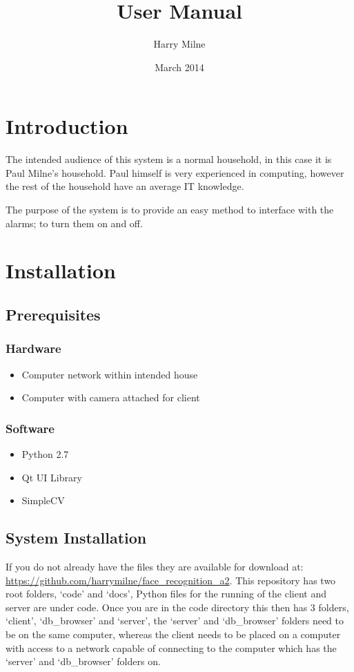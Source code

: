 \documentclass[a4paper]{article}
\title{User Manual}
\author{Harry Milne}
\date{March 2014}
\begin{document}
\maketitle
\tableofcontents
\newpage

\section{Introduction}

    The intended audience of this system is a normal household, in this case it is Paul Milne's household. Paul himself is very experienced
    in computing, however the rest of the household have an average IT knowledge.

    The purpose of the system is to provide an easy method to interface with the alarms; to turn them on and off. 

\section{Installation}
    \subsection{Prerequisites}

        \subsubsection{Hardware}

            \begin{itemize}
                \item Computer network within intended house
                \item Computer with camera attached for client
            \end{itemize}

        \subsubsection{Software}
            \begin{itemize}
                \item Python 2.7
                \item Qt UI Library
                \item SimpleCV
            \end{itemize}

    \subsection{System Installation}
        If you do not already have the files they are available for download at: \url{https://github.com/harrymilne/face_recognition_a2}.
        This repository has two root folders, `code' and `docs', Python files for the running of the client and server are under code.
        Once you are in the code directory this then has 3 folders, `client', `db\_browser' and `server', the `server' and `db\_browser'
        folders need to be on the same computer, whereas the client needs to be placed on a computer with access to a network capable of
        connecting to the computer which has the `server' and `db\_browser' folders on. 
\end{document}
